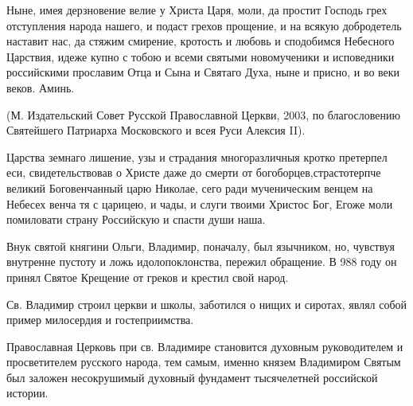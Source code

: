 Ныне, имея дерзновение велие у Христа Царя, моли, да простит Господь грех отступления народа нашего, и подаст грехов прощение, и на всякую добродетель наставит нас, да стяжим смирение, кротость и любовь и сподобимся Небесного Царствия, идеже купно с тобою и всеми святыми новомученики и исповедники российскими прославим Отца и Сына и Святаго Духа, ныне и присно, и во веки веков. Аминь.

(М. Издательский Совет Русской Православной Церкви, 2003, по благословению Святейшего Патриарха Московского и всея Руси Алексия II).
\mychapterending

 




Царства земнаго лишение, узы и страдания многоразличныя кротко претерпел еси, свидетельствовав о Христе даже до смерти от богоборцев,страстотерпче великий Боговенчанный царю Николае, сего ради мученическим венцем на Небесех венча тя с царицею, и чады, и слуги твоими Христос Бог, Егоже моли помиловати страну Российскую и спасти души наша.
\mychapterending

 
Внук святой княгини Ольги, Владимир, поначалу, был язычником, но, чувствуя внутренне пустоту и ложь идолопоклонства, пережил обращение. В 988 году он принял Святое Крещение от греков и крестил свой народ. 


Св. Владимир строил церкви и школы, заботился о нищих и сиротах, являл собой пример милосердия и гостеприимства. 


Православная Церковь при св. Владимире становится духовным руководителем и просветителем русского народа, тем самым, именно князем Владимиром Святым был заложен несокрушимый духовный фундамент тысячелетней российской истории.




